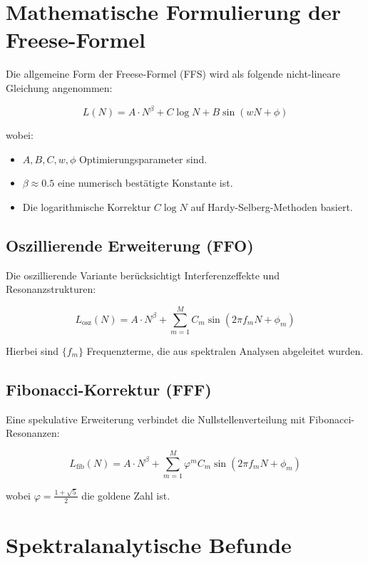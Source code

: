 \documentclass[a4paper,12pt]{article}
\begin{document}
\section{Mathematische Formulierung der Freese-Formel}

Die allgemeine Form der Freese-Formel (FFS) wird als folgende nicht-lineare Gleichung angenommen:

\begin{equation}
L(N) = A \cdot N^\beta + C \log N + B \sin(w N + \phi)
\end{equation}

wobei:

\begin{itemize}
    \item $A, B, C, w, \phi$ Optimierungsparameter sind.
    \item $\beta \approx 0.5$ eine numerisch bestätigte Konstante ist.
    \item Die logarithmische Korrektur $C \log N$ auf Hardy-Selberg-Methoden basiert.
\end{itemize}

\subsection{Oszillierende Erweiterung (FFO)}

Die oszillierende Variante berücksichtigt Interferenzeffekte und Resonanzstrukturen:

\begin{equation}
L_{\text{osz}}(N) = A \cdot N^\beta + \sum_{m=1}^{M} C_m \sin(2\pi f_m N + \phi_m)
\end{equation}

Hierbei sind $\{ f_m \}$ Frequenzterme, die aus spektralen Analysen abgeleitet wurden.

\subsection{Fibonacci-Korrektur (FFF)}

Eine spekulative Erweiterung verbindet die Nullstellenverteilung mit Fibonacci-Resonanzen:

\begin{equation}
L_{\text{fib}}(N) = A \cdot N^\beta + \sum_{m=1}^{M} \varphi^m C_m \sin(2\pi f_m N + \phi_m)
\end{equation}

wobei $\varphi = \frac{1+\sqrt{5}}{2}$ die goldene Zahl ist.

\section{Spektralanalytische Befunde}
\end{document}
